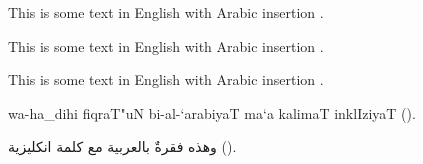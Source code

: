 \documentclass{minimal}
\begin{document}
This is some text in English with Arabic insertion .

This is some text in English with Arabic insertion .

This is some text in English with Arabic insertion .

\begin{arab}
wa-ha_dihi fiqraT"uN bi-al-`arabiyaT ma`a kalimaT inklIziyaT ().
\end{arab}

\begin{arab}[utf]
وهذه فقرةٌ بالعربية مع كلمة انكليزية ().
\end{arab}
\end{document}
